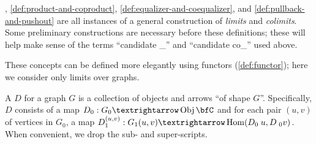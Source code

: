 \documentclass[./thesis.tex]{subfiles}
\begin{document}
, \cref{def:product-and-coproduct},
\cref{def:equalizer-and-coequalizer}, and \cref{def:pullback-and-pushout}
are all instances of a general construction of \textit{limits} and
\textit{colimits}. Some preliminary constructions are necessary before these
definitions; these will help make sense of the terms ``candidate \_'' and
``candidate co\_'' used above.

These concepts can be defined more elegantly using functors
(\cref{def:functor}); here we consider only limits over graphs.


\begin{definition}
  A  $D$ for a graph $G$ is a collection
  of objects and arrows ``of shape $G$''. Specifically, $D$ consists of a map
  $D_0:G_0→\Obj\bfC$ and for each pair $(u,v)$ of vertices in $G_0$,
  a map $D_{1}^{(u,v)}:G_1(u,v)→\Hom(\apply{D_0}{u},\apply{D}_0{v})$.
  When convenient, we drop the sub- and super-scripts.
\end{definition}
\end{document}
